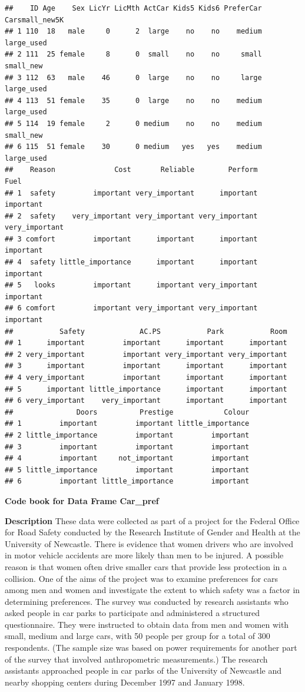 \documentclass[
]{book}
\begin{document}
\begin{verbatim}
##    ID Age    Sex LicYr LicMth ActCar Kids5 Kids6 PreferCar Carsmall_new5K
## 1 110  18   male     0      2  large    no    no    medium     large_used
## 2 111  25 female     8      0  small    no    no     small      small_new
## 3 112  63   male    46      0  large    no    no     large     large_used
## 4 113  51 female    35      0  large    no    no    medium     large_used
## 5 114  19 female     2      0 medium    no    no    medium      small_new
## 6 115  51 female    30      0 medium   yes   yes    medium     large_used
##    Reason              Cost       Reliable        Perform           Fuel
## 1  safety         important very_important      important      important
## 2  safety    very_important very_important very_important very_important
## 3 comfort         important      important      important      important
## 4  safety little_importance      important      important      important
## 5   looks         important      important very_important      important
## 6 comfort         important very_important very_important      important
##           Safety             AC.PS           Park           Room
## 1      important         important      important      important
## 2 very_important         important very_important very_important
## 3      important         important      important      important
## 4 very_important         important      important      important
## 5      important little_importance      important      important
## 6 very_important    very_important      important      important
##               Doors          Prestige            Colour
## 1         important         important little_importance
## 2 little_importance         important         important
## 3         important         important         important
## 4         important     not_important         important
## 5 little_importance         important         important
## 6         important little_importance         important
\end{verbatim}

\textbf{Code book for Data Frame Car\_pref}

\textbf{Description}
These data were collected as part of a project for the Federal Office for Road Safety conducted by the Research Institute of Gender and Health at the University of Newcastle. There is evidence that women drivers who are involved in motor vehicle accidents are more likely than men to be injured. A possible reason is that women often drive smaller cars that provide less protection in a collision. One of the aims of the project was to examine preferences for cars among men and women and investigate the extent to which safety was a factor in determining preferences. The survey was conducted by research assistants who asked people in car parks to participate and administered a structured questionnaire. They were instructed to obtain data from men and women with small, medium and large cars, with 50 people per group for a total of 300 respondents. (The sample size was based on power requirements for another part of the survey that involved anthropometric measurements.) The research assistants approached people in car parks of the University of Newcastle and nearby shopping centers during December 1997 and January 1998.
\end{document}
